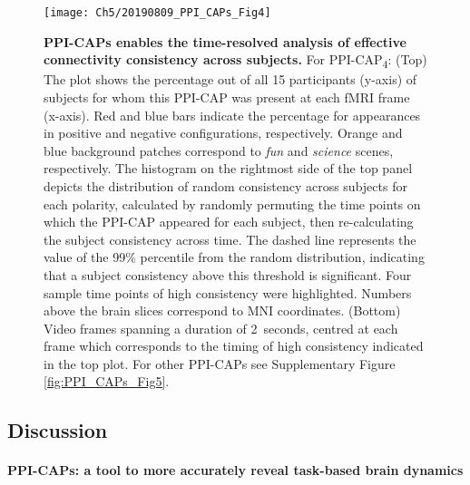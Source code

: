 \begin{figure}[h!]
\centering
\texttt{[image: Ch5/20190809\_PPI\_CAPs\_Fig4]}
\caption{\textbf{PPI-CAPs enables the time-resolved analysis of  effective connectivity consistency across subjects.} For PPI-CAP\textsubscript{4}: (Top) The plot shows the percentage out of all 15 participants (y-axis) of subjects for whom this PPI-CAP was present at each fMRI frame (x-axis). Red and blue bars indicate the percentage for appearances in positive and negative configurations, respectively. Orange and blue background patches correspond to \textit{fun} and \textit{science} scenes, respectively. The histogram on the rightmost side of the top panel depicts the distribution of random consistency across subjects for each polarity, calculated by randomly permuting the time points on which the PPI-CAP appeared for each subject, then re-calculating the subject consistency across time. The dashed line represents the value of the 99\% percentile from the random distribution, indicating that a subject consistency above this threshold is significant. Four sample time points of high consistency were highlighted. Numbers above the brain slices correspond to MNI coordinates. (Bottom) Video frames spanning a duration of 2~seconds, centred at each frame which corresponds to the timing of high consistency indicated in the top plot. For other PPI-CAPs see Supplementary Figure \ref{fig:PPI_CAPs_Fig5}.  }
\label{fig:PPI_CAPs_Fig4}
\end{figure}



\subsection{Discussion}

\paragraph{PPI-CAPs: a tool to more accurately reveal task-based brain dynamics}


